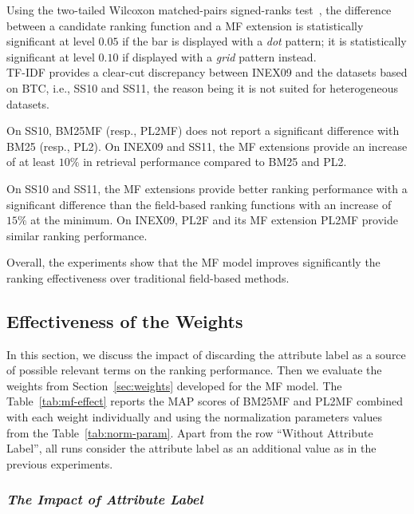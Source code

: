 Using the two-tailed Wilcoxon matched-pairs signed-ranks test~\cite{sheskin:2003:CRC,buttcher:2010:IRI:1869919}, the difference between a candidate ranking function and a MF extension is statistically significant at level $0.05$ if the bar is displayed with a \textit{dot} pattern; it is statistically significant at level $0.10$ if displayed with a \emph{grid} pattern instead.\\

TF-IDF provides a clear-cut discrepancy between INEX09 and the datasets based on BTC, i.e., SS10 and SS11, the reason being it is not suited for heterogeneous datasets.

On SS10, BM25MF (resp., PL2MF) does not report a significant difference with BM25 (resp., PL2). On INEX09 and SS11, the MF extensions provide an increase of at least $10\%$ in retrieval performance compared to BM25 and PL2.

On SS10 and SS11, the MF extensions provide better ranking performance with a significant difference than the field-based ranking functions with an increase of $15\%$ at the minimum. On INEX09, PL2F and its MF extension PL2MF provide similar ranking performance.

Overall, the experiments show that the MF model improves significantly the ranking effectiveness over traditional field-based methods.



\subsection{Effectiveness of the Weights}
\label{sec:weights-effectiveness}

In this section, we discuss the impact of discarding the attribute label as a source of possible relevant terms on the ranking performance. Then we evaluate the weights from Section~\ref{sec:weights} developed for the MF model.
The Table~\ref{tab:mf-effect} reports the MAP scores of BM25MF and PL2MF combined with each weight individually and using the normalization parameters values from the Table~\ref{tab:norm-param}. Apart from the row ``Without Attribute Label'', all runs consider the attribute label as an additional value as in the previous experiments.

\subsubsection{\emph{The Impact of Attribute Label}}
\label{sec:with-att}

